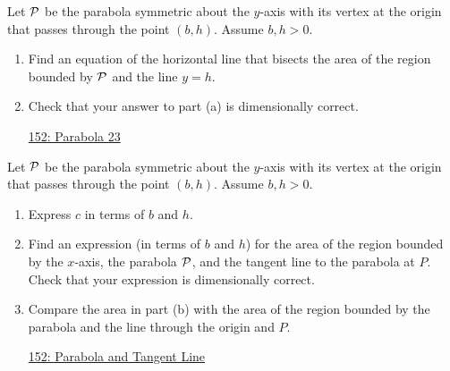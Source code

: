 \documentclass{ximera}
\begin{document}
\begin{question} \label{Q88w88ewe}
Let ${\cal P}$ be the parabola symmetric about the $y$-axis with its vertex at the origin that passes through the point $(b,h)$. Assume $b,h>0$.

\begin{enumerate}

\item Find an equation of the horizontal line that bisects the area of the region bounded by ${\cal P}$ and the line $y=h$.

\item Check that your answer to part (a) is dimensionally correct.

\begin{onlineOnly}
    \begin{center}
\end{center}
\end{onlineOnly}

\href{https://www.desmos.com/calculator/mbxrsmdho8}{152: Parabola 23}

\end{enumerate}
\end{question}


\begin{question} \label{Q88w4448ewe}
Let ${\cal P}$ be the parabola symmetric about the $y$-axis with its vertex at the origin that passes through the point $(b,h)$. Assume $b,h>0$.

\begin{enumerate}
\item Express $c$ in terms of $b$ and $h$.

\item Find an expression (in terms of $b$ and $h$) for the area of the region bounded by the $x$-axis, the parabola ${\cal P}$, and the tangent line to the parabola at $P$. Check that your expression is dimensionally correct.

\item Compare the area in part (b) with the area of the region bounded by the parabola and the line through the origin and $P$.

\begin{onlineOnly}
    \begin{center}
\end{center}
\end{onlineOnly}

\href{https://www.desmos.com/calculator/3ulhw9wx4w}{152: Parabola and Tangent Line}

\end{enumerate}
\end{question}
\end{document}
